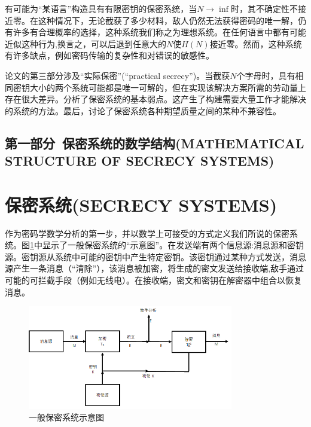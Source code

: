 \documentclass[]{article}
\begin{document}
有可能为“某语言”构造具有有限密钥的保密系统，当$N\rightarrow \inf$时，其不确定性不接近零。在这种情况下，无论截获了多少材料，敌人仍然无法获得密码的唯一解，仍有许多有合理概率的选择，这种系统我们称之为理想系统。在任何语言中都有可能近似这种行为,换言之，可以后退到任意大的$N$使$H(N)$接近零。然而，这种系统有许多缺点，例如密码传输的复杂性和对错误的敏感性。

论文的第三部分涉及“实际保密”(“practical secrecy”)。当截获$N$个字母时，具有相同密钥大小的两个系统可能都是唯一可解的，但在实现该解决方案所需的劳动量上存在很大差异。分析了保密系统的基本弱点。这产生了构建需要大量工作才能解决的系统的方法。最后，讨论了保密系统各种期望质量之间的某种不兼容性。

\begin{center}
	\section*{第一部分\ 保密系统的数学结构(MATHEMATICAL STRUCTURE OF SECRECY SYSTEMS)}
\end{center}

\section{保密系统(SECRECY SYSTEMS)}

作为密码学数学分析的第一步，并以数学上可接受的方式定义我们所说的保密系统。图\ref{Fig:fig1}中显示了一般保密系统的“示意图”。在发送端有两个信息源:消息源和密钥源。密钥源从系统中可能的密钥中产生特定密钥。该密钥通过某种方式发送，消息源产生一条消息（“清除”），该消息被加密，将生成的密文发送给接收端,敌手通过可能的可拦截手段（例如无线电）。在接收端，密文和密钥在解密器中组合以恢复消息。
\par

\begin{figure}[htbp]
	\centering
	\includegraphics[width=0.8\textwidth]{general-secrecy-system.png}
	\caption{一般保密系统示意图}
	\label{Fig:fig1}
\end{figure}
\end{document}
